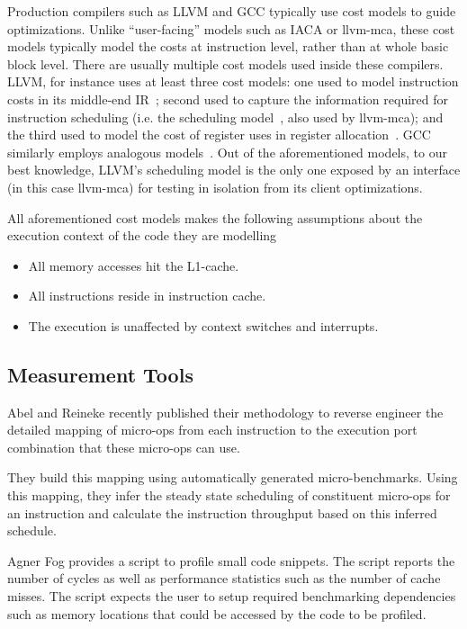 Production compilers such as LLVM\cite{llvm} and GCC typically use cost models 
to guide optimizations.
Unlike ``user-facing'' models such as IACA or llvm-mca, these cost models typically
model the costs at instruction level, rather than at whole basic block level.
There are usually multiple cost models used inside these compilers.
LLVM, for instance uses at least three cost models: 
one used to model instruction costs in its middle-end IR~\cite{llvm-cost};
second used to capture the information required for instruction scheduling 
(i.e. the scheduling model~\cite{llvm-sched}, also used by llvm-mca);
and the third used to model the cost of register uses in register allocation~\cite{llvm-reg}.
GCC similarly employs analogous models~\cite{gcc-cost,gcc-sched}.
Out of the aforementioned models, to our best knowledge, 
LLVM's scheduling model is the only one exposed by an interface
(in this case llvm-mca) for testing in isolation from its client optimizations.


\vspace{1em}
All aforementioned cost models makes the following assumptions about the execution context
of the code they are modelling
\begin{itemize}
    \item All memory accesses hit the L1-cache.
    \item All instructions reside in instruction cache.
    \item The execution is unaffected by context switches and interrupts.
\end{itemize}

\subsection{Measurement Tools}
Abel and Reineke\cite{uops} recently published their methodology
to reverse engineer the detailed mapping of micro-ops
from each instruction to the execution port combination
that these micro-ops can use.

They build this mapping using automatically generated micro-benchmarks.
Using this mapping, they infer the steady state scheduling of constituent
micro-ops for an instruction and calculate the instruction throughput based on
this inferred schedule.

Agner Fog\cite{agner} provides a script to profile small code snippets.
The script reports the number of cycles as well as performance statistics such as 
the number of cache misses.
The script expects the user to setup required benchmarking dependencies such as 
memory locations that could be accessed by the code to be profiled.

